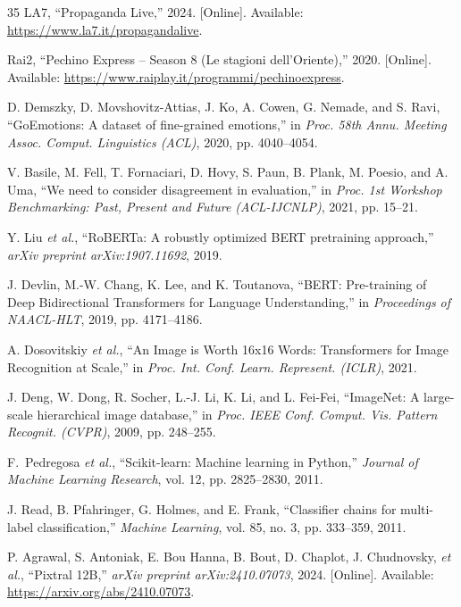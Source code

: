 \documentclass[letterpaper,journal]{IEEEtran}
\begin{document}
\begin{thebibliography}{35}
 LA7, ``Propaganda Live,'' 2024. [Online]. Available: \url{https://www.la7.it/propagandalive}.

 Rai2, ``Pechino Express -- Season 8 (Le stagioni dell'Oriente),'' 2020. [Online]. Available: \url{https://www.raiplay.it/programmi/pechinoexpress}.

 D. Demszky, D. Movshovitz-Attias, J. Ko, A. Cowen, G. Nemade, and S. Ravi, ``GoEmotions: A dataset of fine-grained emotions,'' in \textit{Proc. 58th Annu. Meeting Assoc. Comput. Linguistics (ACL)}, 2020, pp. 4040--4054.

 V. Basile, M. Fell, T. Fornaciari, D. Hovy, S. Paun, B. Plank, M. Poesio, and A. Uma, ``We need to consider disagreement in evaluation,'' in \textit{Proc. 1st Workshop Benchmarking: Past, Present and Future (ACL-IJCNLP)}, 2021, pp. 15--21.

 Y. Liu \textit{et al.}, ``RoBERTa: A robustly optimized BERT pretraining approach,'' \textit{arXiv preprint arXiv:1907.11692}, 2019.

 J. Devlin, M.-W. Chang, K. Lee, and K. Toutanova, ``BERT: Pre-training of Deep Bidirectional Transformers for Language Understanding,'' in \textit{Proceedings of NAACL-HLT}, 2019, pp. 4171--4186.

 A. Dosovitskiy \textit{et al.}, ``An Image is Worth 16x16 Words: Transformers for Image Recognition at Scale,'' in \textit{Proc. Int. Conf. Learn. Represent. (ICLR)}, 2021.

 J. Deng, W. Dong, R. Socher, L.-J. Li, K. Li, and L. Fei-Fei, ``ImageNet: A large-scale hierarchical image database,'' in \textit{Proc. IEEE Conf. Comput. Vis. Pattern Recognit. (CVPR)}, 2009, pp. 248--255.

 F.~Pedregosa \textit{et al.}, ``Scikit-learn: Machine learning in Python,'' \textit{Journal of Machine Learning Research}, vol. 12, pp. 2825--2830, 2011.

 J. Read, B. Pfahringer, G. Holmes, and E. Frank, ``Classifier chains for multi-label classification,'' \textit{Machine Learning}, vol. 85, no. 3, pp. 333--359, 2011.

 P. Agrawal, S. Antoniak, E. Bou Hanna, B. Bout, D. Chaplot, J. Chudnovsky, \textit{et al.}, ``Pixtral 12B,'' \textit{arXiv preprint arXiv:2410.07073}, 2024. [Online]. Available: \url{https://arxiv.org/abs/2410.07073}.


\end{thebibliography}
\end{document}
